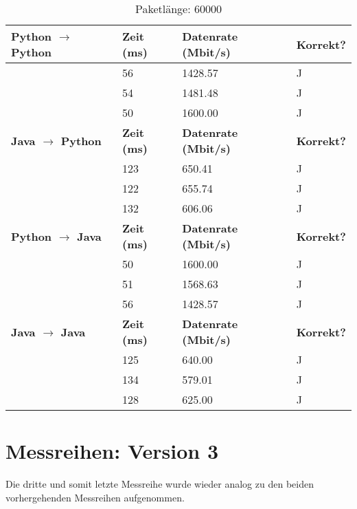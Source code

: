 \documentclass{article}
\begin{document}
    \begin{table}[]
        \caption{Paketlänge: 60000}
        \label{tab:my-tablev2_60000}
        \begin{tabular}{|l|l|l|l|}
            \hline
            \textbf{Python $\rightarrow$ Python} & \textbf{Zeit (ms)} & \textbf{Datenrate (Mbit/s)} & \textbf{Korrekt?} \\ \hline
            & 56       & 1428.57         & J        \\ \cline{2-4}
            & 54       & 1481.48         & J        \\ \cline{2-4}
            & 50       & 1600.00         & J        \\ \hline
            \textbf{Java $\rightarrow$ Python}   & \textbf{Zeit (ms)} & \textbf{Datenrate (Mbit/s)} & \textbf{Korrekt?} \\ \hline
            & 123      & 650.41          & J        \\ \cline{2-4}
            & 122      & 655.74          & J        \\ \cline{2-4}
            & 132      & 606.06          & J        \\ \hline
            \textbf{Python $\rightarrow$ Java}  & \textbf{Zeit (ms)} & \textbf{Datenrate (Mbit/s)} & \textbf{Korrekt?} \\ \hline
            & 50       & 1600.00         & J        \\ \cline{2-4}
            & 51       & 1568.63         & J        \\ \cline{2-4}
            & 56       & 1428.57         & J        \\ \hline
            \textbf{Java $\rightarrow$ Java}   & \textbf{Zeit (ms)} & \textbf{Datenrate (Mbit/s)} & \textbf{Korrekt?} \\ \hline
            & 125      & 640.00          & J        \\ \cline{2-4}
            & 134      & 579.01          & J        \\ \cline{2-4}
            & 128      & 625.00          & J        \\ \hline
        \end{tabular}
    \end{table}

    \newpage

    \section{Messreihen: Version 3}
    Die dritte und somit letzte Messreihe wurde wieder analog zu den beiden vorhergehenden Messreihen aufgenommen.\\
\end{document}
